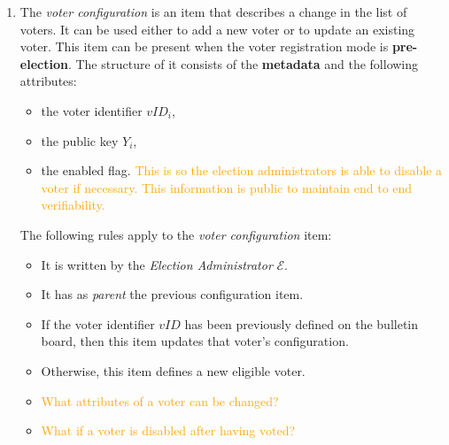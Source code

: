 \begin{enumerate}
    \item
        The \textit{voter configuration} is an item that describes a change in the list of voters. It can be used either to add a new voter or to update an existing voter. This item can be present when the voter registration mode is \textbf{pre-election}. The structure of it consists of the \textbf{metadata} and the following attributes:
        \begin{itemize}
            \item the voter identifier $vID_i$,
            \item the public key $Y_i$,
            \item the enabled flag. \textcolor{orange}{This is so the election administrators is able to disable a voter if necessary. This information is public to maintain end to end verifiability.}
        \end{itemize}
        The following rules apply to the \textit{voter configuration} item:
        \begin{itemize}
            \item It is written by the \textit{Election Administrator} $\mathcal{E}$.
            \item It has as \textit{parent} the previous configuration item.
            \item If the voter identifier $vID$ has been previously defined on the bulletin board, then this item updates that voter's configuration.
            \item Otherwise, this item defines a new eligible voter.
            \item \textcolor{orange}{What attributes of a voter can be changed?}
            \item \textcolor{orange}{What if a voter is disabled after having voted?}
        \end{itemize}
    

\end{enumerate}

